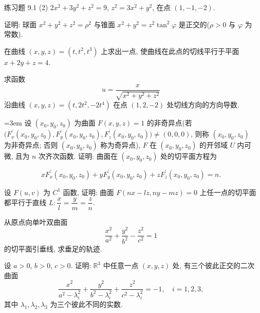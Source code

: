 \begin{exblock}{练习题 9.1}
  (2) $2x^{2} + 3y^{2} + z^{2} = 9$, $z^{2} = 3x^{2} + y^{2}$, 在点 $(1, -1, -2)$.

  \item 证明: 球面 $x^{2} + y^{2} + z^{2} = \rho^{2}$ 与锥面 $x^{2} + y^{2} = z^{2}\tan^{2}\varphi$ 是正交的($\rho > 0$ 与 $\varphi$ 为常数).

  \item 在曲线 $(x, y, z) = (t, t^{2}, t^{3})$ 上求出一点, 使曲线在此点的切线平行于平面 $x + 2y + z = 4$.

  \item 求函数
  \[ u = \frac{x}{\sqrt{x^{2} + y^{2} + z^{2}}} \]
  沿曲线 $(x, y, z) = (t, 2t^{2}, -2t^{4})$ 在点 $(1, 2, -2)$ 处切线方向的方向导数.

  \item {\emergencystretch=3em 设 $(x_{0}, y_{0}, z_{0})$ 为曲面 $F(x, y, z) = 1$ 的非奇异点(若
  $\bigl(F_{x}^{\prime}(x_{0}, y_{0}, z_{0}),\allowbreak F_{y}^{\prime}(x_{0}, y_{0}, z_{0}),\allowbreak F_{z}^{\prime}(x_{0}, y_{0}, z_{0})\bigr) \neq (0, 0, 0)$, 则称 $(x_{0}, y_{0}, z_{0})$ 为非奇异点; 否则 $(x_{0}, y_{0}, z_{0})$ 称为奇异点), $F$ 在 $(x_{0}, y_{0}, z_{0})$ 的开邻域 $U$ 内可微, 且为 $n$ 次齐次函数. 证明: 曲面在 $(x_{0}, y_{0}, z_{0})$ 处的切平面方程为\par}
  \[
    xF_{x}^{\prime}(x_{0}, y_{0}, z_{0}) + yF_{y}^{\prime}(x_{0}, y_{0}, z_{0})
    + zF_{z}^{\prime}(x_{0}, y_{0}, z_{0}) = n.
  \]

  \item 设 $F(u, v)$ 为 $C^{1}$ 函数, 证明: 曲面 $F(nx - lz, ny - mz) = 0$ 上任一点的切平面都平行于直线 $L\colon \dfrac{x}{l} = \dfrac{y}{m} = \dfrac{z}{n}$.

  \item 从原点向单叶双曲面
  \[ \frac{x^{2}}{a^{2}} + \frac{y^{2}}{b^{2}} - \frac{z^{2}}{c^{2}} = 1 \]
  的切平面引垂线, 求垂足的轨迹.

  \item 设 $a > 0$, $b > 0$, $c > 0$. 证明: $\mathbb{R}^{3}$ 中任意一点 $(x, y, z)$ 处, 有三个彼此正交的二次曲面
  \[ \frac{x^{2}}{a^{2} - \lambda_{i}^{2}} + \frac{y^{2}}{b^{2} - \lambda_{i}^{2}} + \frac{z^{2}}{c^{2} - \lambda_{i}^{2}} = -1, \quad i = 1, 2, 3, \]
  其中 $\lambda_{1}, \lambda_{2}, \lambda_{3}$ 为三个彼此不同的实数.
\end{exblock}

